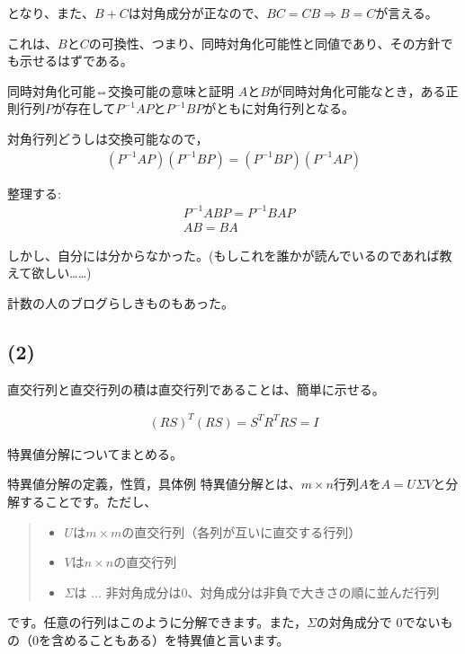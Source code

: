 \documentclass[a4paper, 10pt, dvipdfmx]{jlreq}
\begin{document}
となり、また、$B+C$は対角成分が正なので、$BC=CB \Rightarrow B=C$が言える。

これは、$B$と$C$の可換性、つまり、同時対角化可能性と同値であり、その方針でも示せるはずである。

\begin{itembox}[l]{同時対角化可能⇔交換可能の意味と証明\cite{site:1}}
  $A$と$B$が同時対角化可能なとき，ある正則行列$P$が存在して$P^{-1}AP$と$P^{-1}BP$がともに対角行列となる。

  対角行列どうしは交換可能なので，
  \begin{align*}
    (P^{-1}AP)(P^{-1}BP)=(P^{-1}BP)(P^{-1}AP)
  \end{align*}

  整理する:
  \begin{align*}
     & P^{-1}ABP=P^{-1}BAP \\
     & AB=BA
  \end{align*}
\end{itembox}

しかし、自分には分からなかった。(もしこれを誰かが読んでいるのであれば教えて欲しい……)

計数の人のブログらしきものもあった。\cite{site:2}

\subsection*{(2)}

直交行列と直交行列の積は直交行列であることは、簡単に示せる。

\begin{align*}
  (RS)^T(RS)=S^TR^TRS=I
\end{align*}

特異値分解についてまとめる。

\begin{itembox}[l]{特異値分解の定義，性質，具体例\cite{site:3}}
  特異値分解とは、$m\times n$行列$A$を$A=U \Sigma V$と分解することです。ただし、

  \begin{quote}
    \begin{itemize}
      \item $U$は$m \times m$の直交行列（各列が互いに直交する行列）
      \item $V$は$n \times n$の直交行列
      \item $\Sigma$は ... 非対角成分は0、対角成分は非負で大きさの順に並んだ行列
    \end{itemize}
  \end{quote}

  です。任意の行列はこのように分解できます。また，$Σ$の対角成分で 0でないもの（0を含めることもある）を特異値と言います。
\end{itembox}
\end{document}

